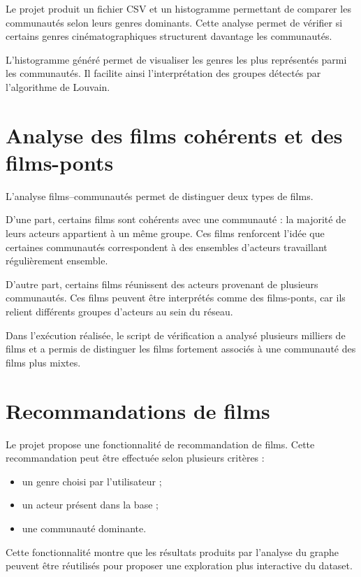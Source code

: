 \documentclass[11pt,a4paper,oneside,openany]{report}
\begin{document}
Le projet produit un fichier CSV et un histogramme permettant de comparer les communautés selon leurs genres dominants. Cette analyse permet de vérifier si certains genres cinématographiques structurent davantage les communautés.

L’histogramme généré permet de visualiser les genres les plus représentés parmi les communautés. Il facilite ainsi l’interprétation des groupes détectés par l’algorithme de Louvain.

\section{Analyse des films cohérents et des films-ponts}

L’analyse films--communautés permet de distinguer deux types de films.

D’une part, certains films sont cohérents avec une communauté : la majorité de leurs acteurs appartient à un même groupe. Ces films renforcent l’idée que certaines communautés correspondent à des ensembles d’acteurs travaillant régulièrement ensemble.

D’autre part, certains films réunissent des acteurs provenant de plusieurs communautés. Ces films peuvent être interprétés comme des films-ponts, car ils relient différents groupes d’acteurs au sein du réseau.

Dans l’exécution réalisée, le script de vérification a analysé plusieurs milliers de films et a permis de distinguer les films fortement associés à une communauté des films plus mixtes.

\section{Recommandations de films}

Le projet propose une fonctionnalité de recommandation de films. Cette recommandation peut être effectuée selon plusieurs critères :

\begin{itemize}
    \item un genre choisi par l’utilisateur ;
    \item un acteur présent dans la base ;
    \item une communauté dominante.
\end{itemize}

Cette fonctionnalité montre que les résultats produits par l’analyse du graphe peuvent être réutilisés pour proposer une exploration plus interactive du dataset.
\end{document}
